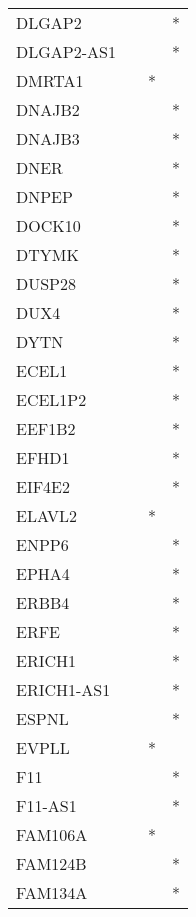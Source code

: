 \begin{longtable}{lccc}
DLGAP2         &           &     &       * \\
DLGAP2-AS1     &           &     &       * \\
DMRTA1         &           &   * &         \\
DNAJB2         &           &     &       * \\
DNAJB3         &           &     &       * \\
DNER           &           &     &       * \\
DNPEP          &           &     &       * \\
DOCK10         &           &     &       * \\
DTYMK          &           &     &       * \\
DUSP28         &           &     &       * \\
DUX4           &           &     &       * \\
DYTN           &           &     &       * \\
ECEL1          &           &     &       * \\
ECEL1P2        &           &     &       * \\
EEF1B2         &           &     &       * \\
EFHD1          &           &     &       * \\
EIF4E2         &           &     &       * \\
ELAVL2         &           &   * &         \\
ENPP6          &           &     &       * \\
EPHA4          &           &     &       * \\
ERBB4          &           &     &       * \\
ERFE           &           &     &       * \\
ERICH1         &           &     &       * \\
ERICH1-AS1     &           &     &       * \\
ESPNL          &           &     &       * \\
EVPLL          &           &   * &         \\
F11            &           &     &       * \\
F11-AS1        &           &     &       * \\
FAM106A        &           &   * &         \\
FAM124B        &           &     &       * \\
FAM134A        &           &     &       * \\

\end{longtable}
